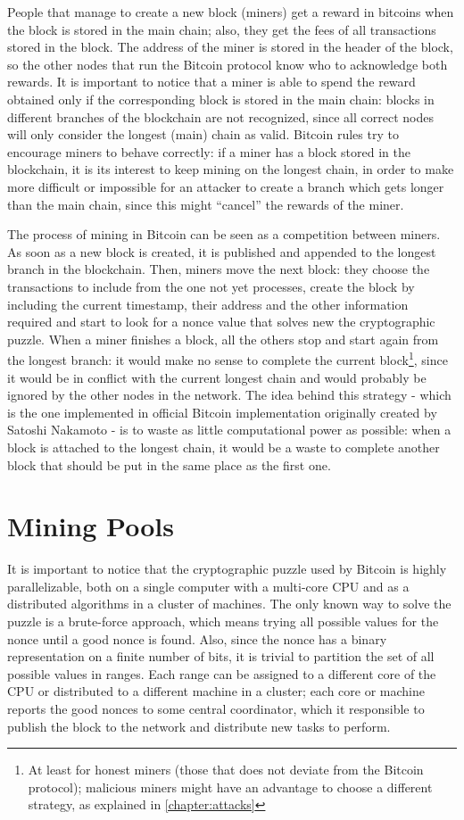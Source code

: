 \bigskip
People that manage to create a new block (miners) get a reward in bitcoins when the block is stored in the main chain;
also, they get the fees of all transactions stored in the block.
The address of the miner is stored in the header of the block, so the other nodes that run the Bitcoin protocol know who to acknowledge both rewards.
It is important to notice that a miner is able to spend the reward obtained only if the corresponding block is stored in the main chain:
blocks in different branches of the blockchain are not recognized, since all correct nodes will only consider the longest (main) chain as valid.
Bitcoin rules try to encourage miners to behave correctly:
if a miner has a block stored in the blockchain, it is its interest to keep mining on the longest chain, in order to make more difficult or impossible for an attacker to create a branch which gets longer than the main chain, since this might ``cancel'' the rewards of the miner.

\bigskip
The process of mining in Bitcoin can be seen as a competition between miners.
As soon as a new block is created, it is published and appended to the longest branch in the blockchain.
Then, miners move the next block:
they choose the transactions to include from the one not yet processes, create the block by including the current timestamp, their address and the other information required and start to look for a nonce value that solves new the cryptographic puzzle.
When a miner finishes a block, all the others stop and start again from the longest branch:
it would make no sense to complete the current block\footnote{At least for honest miners (those that does not deviate from the Bitcoin protocol); malicious miners might have an advantage to choose a different strategy, as explained in \cref{chapter:attacks}}, since it would be in conflict with the current longest chain and would probably be ignored by the other nodes in the network.
The idea behind this strategy - which is the one implemented in official Bitcoin implementation originally created by Satoshi Nakamoto \cite{bitcoin_github} - is to waste as little computational power as possible:
when a block is attached to the longest chain, it would be a waste to complete another block that should be put in the same place as the first one.

\section{Mining Pools}
It is important to notice that the cryptographic puzzle used by Bitcoin is highly parallelizable, both on a single computer with a multi-core \ac{CPU} and as a distributed algorithms in a cluster of machines.
The only known way to solve the puzzle is a brute-force approach, which means trying all possible values for the nonce until a good nonce is found.
Also, since the nonce has a binary representation on a finite number of bits, it is trivial to partition the set of all possible values in ranges.
Each range can be assigned to a different core of the \ac{CPU} or distributed to a different machine in a cluster;
each core or machine reports the good nonces to some central coordinator, which it responsible to publish the block to the network and distribute new tasks to perform.

